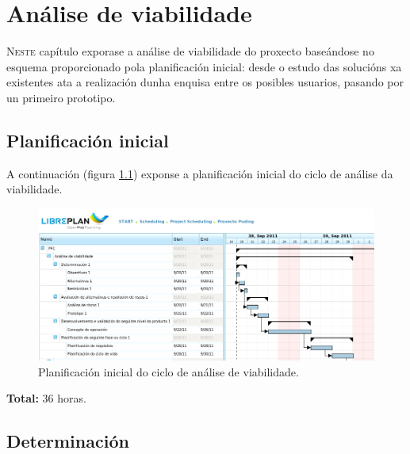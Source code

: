 \chapter{Análise de viabilidade}
\minitoc
\label{chap:viabilidad}
\vspace{0.5cm}


\lettrine{N}{este} capítulo exporase a análise de viabilidade do proxecto
baseándose no esquema proporcionado pola planificación inicial: desde o estudo
das solucións xa existentes ata a realización dunha enquisa entre os posibles
usuarios, pasando por un primeiro prototipo.

\section{Planificación inicial}

A continuación (figura \ref{figura:PlanificacionInicialViabilidade}) exponse a
planificación inicial do ciclo de análise da viabilidade.

\begin{figure}[htbp]
 \centering
 \includegraphics[scale=0.6,keepaspectratio=true]{./imagenes/viabilidade.png}
 \caption{Planificación inicial do ciclo de análise de viabilidade.}
 \label{figura:PlanificacionInicialViabilidade}
\end{figure}

\textbf{Total:} 36 horas.

\section{Determinación}

